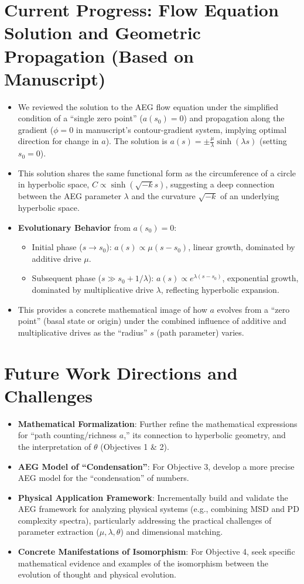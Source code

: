 \documentclass[12pt]{article}
\begin{document}
\section{Current Progress: Flow Equation Solution and Geometric Propagation (Based on Manuscript)}
\begin{itemize}
    \item We reviewed the solution to the AEG flow equation under the simplified condition of a ``single zero point'' ($a(s_0)=0$) and propagation along the gradient ($\phi=0$ in manuscript's contour-gradient system, implying optimal direction for change in $a$). The solution is $a(s) = \pm \frac{\mu}{\lambda} \sinh(\lambda s)$ (setting $s_0=0$).
    \item This solution shares the same functional form as the circumference of a circle in hyperbolic space, $C \propto \sinh(\sqrt{-k}s)$, suggesting a deep connection between the AEG parameter $\lambda$ and the curvature $\sqrt{-k}$ of an underlying hyperbolic space.
    \item \textbf{Evolutionary Behavior} from $a(s_0)=0$:
    \begin{itemize}
        \item Initial phase ($s \to s_0$): $a(s) \propto \mu (s-s_0)$, linear growth, dominated by additive drive $\mu$.
        \item Subsequent phase ($s \gg s_0 + 1/\lambda$): $a(s) \propto e^{\lambda (s-s_0)}$, exponential growth, dominated by multiplicative drive $\lambda$, reflecting hyperbolic expansion.
    \end{itemize}
    \item This provides a concrete mathematical image of how $a$ evolves from a ``zero point'' (basal state or origin) under the combined influence of additive and multiplicative drives as the ``radius'' $s$ (path parameter) varies.
\end{itemize}

\section{Future Work Directions and Challenges}
\begin{itemize}
    \item \textbf{Mathematical Formalization}: Further refine the mathematical expressions for ``path counting/richness $a$,'' its connection to hyperbolic geometry, and the interpretation of $\theta$ (Objectives 1 \& 2).
    \item \textbf{AEG Model of ``Condensation''}: For Objective 3, develop a more precise AEG model for the ``condensation'' of numbers.
    \item \textbf{Physical Application Framework}: Incrementally build and validate the AEG framework for analyzing physical systems (e.g., combining MSD and PD complexity spectra), particularly addressing the practical challenges of parameter extraction ($\mu, \lambda, \theta$) and dimensional matching.
    \item \textbf{Concrete Manifestations of Isomorphism}: For Objective 4, seek specific mathematical evidence and examples of the isomorphism between the evolution of thought and physical evolution.
\end{itemize}
\end{document}
